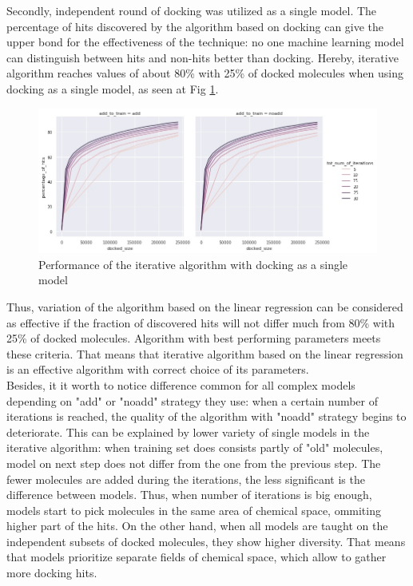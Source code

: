Secondly, independent round of docking was utilized as a single model.
The percentage of hits discovered by the algorithm based on docking can give the upper bond for the effectiveness of the technique: no one machine learning model can distinguish between hits and non-hits better than docking.
Hereby, iterative algorithm reaches values of about 80\% with 25\% of docked molecules when using docking as a single model, as seen at Fig \ref{docking}.\\

\begin{figure}[H]
    \centering
    \includegraphics[width = \linewidth]{Images/DockingIterations.jpg}
    \caption{Performance of the iterative algorithm with docking as a single model}
    \label{docking}
\end{figure}

Thus, variation of the algorithm based on the linear regression can be considered as effective if the fraction of discovered hits will not differ much from 80\% with 25\% of docked molecules. 
Algorithm with best performing parameters meets these criteria.
That means that iterative algorithm based on the linear regression is an effective algorithm with correct choice of its parameters.\\

Besides, it it worth to notice difference common for all complex models depending on "add" or "noadd" strategy they use: when a certain number of iterations is reached, the quality of the algorithm with "noadd" strategy begins to deteriorate.
This can be explained by lower variety of single models in the iterative algorithm: when training set does consists partly of "old" molecules, model on next step does not differ from the one from the previous step.
The fewer molecules are added during the iterations, the less significant is the difference between models.
Thus, when number of iterations is big enough, models start to pick molecules in the same area of chemical space, ommiting higher part of the hits.
On the other hand, when all models are taught on the independent subsets of docked molecules, they show higher diversity.
That means that models prioritize separate fields of chemical space, which allow to gather more docking hits.\\


